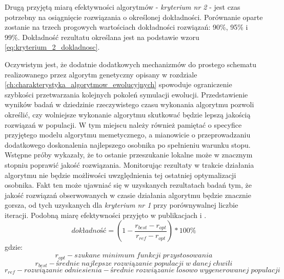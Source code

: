\par
Drugą przyjętą miarą efektywności algorytmów - \emph{kryterium nr 2} - jest czas potrzebny na osiągnięcie rozwiązania o określonej dokładności. Porównanie oparte zostanie na trzech progowych wartościach dokładności rozwiązań: 90\%, 95\% i 99\%. Dokładność rezultatu określana jest na podstawie wzoru \ref{eq:kryterium_2_dokladnosc}. 
\par
Oczywistym jest, że dodatnie dodatkowych mechanizmów do prostego schematu realizowanego przez algorytm genetyczny opisany w rozdziale \ref{ch:charakterystyka_algorytmow_ewolucyjnych} spowoduje ograniczenie szybkości przetwarzania kolejnych pokoleń symulacji ewolucji. Przedstawienie wyników badań w dziedzinie rzeczywistego czasu wykonania algorytmu pozwoli określić, czy wolniejsze wykonanie algorytmu skutkować będzie lepszą jakością rozwiązań w populacji. W tym miejscu należy również pamiętać o specyfice przyjętego modelu algorytmu memetycznego, a mianowicie o przeprowadzaniu dodatkowego doskonalenia najlepszego osobnika po spełnieniu warunku stopu. Wstępne próby wykazały, że to ostanie przeszukanie lokalne może w znacznym stopniu poprawić jakość rozwiązania. Monitorując rezultaty w trakcie działania algorytmu nie będzie możliwości uwzględnienia tej ostatniej optymalizacji osobnika. Fakt ten może ujawniać się w uzyskanych rezultatach badań tym, że jakość rozwiązań obserwowanych w czasie działania algorytmu będzie znacznie gorsza, od tych uzyskanych dla \emph{kryterium nr 1} przy porównywalnej liczbie iteracji. Podobną miarę efektywności przyjęto w publikacjach \cite{elbeltagi2005comparison} i \cite{mullen2014continuous}.
\begin{equation} \label{eq:kryterium_2_dokladnosc}
dokładność = \left(1-\frac{r_{best}-r_{opt}}{r_{ref}-r_{opt}}\right)*100\%
\end{equation}
gdzie:
\[r_{opt} - szukane\; minimum\; funkcji\; przystosowania\]
\[r_{best} - średnie\; najlepsze\; rozwiązanie\; populacji\; w\; danej\; chwili\]
\[r_{ref} - rozwiązanie\; odniesienia - średnie\; rozwiązanie\; losowo\; wygenerowanej\; populacji\]


